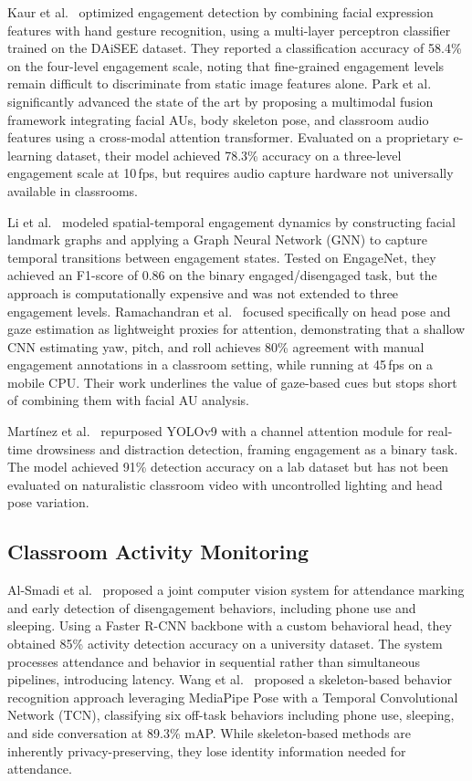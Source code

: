 \documentclass[preprint,12pt]{elsarticle}
\begin{document}
Kaur et al.~\cite{engagement_springer} optimized engagement detection by combining facial expression features with hand gesture recognition, using a multi-layer perceptron classifier trained on the DAiSEE dataset. They reported a classification accuracy of 58.4\% on the four-level engagement scale, noting that fine-grained engagement levels remain difficult to discriminate from static image features alone. Park et al.~\cite{lit_engagement_multimodal_2025} significantly advanced the state of the art by proposing a multimodal fusion framework integrating facial AUs, body skeleton pose, and classroom audio features using a cross-modal attention transformer. Evaluated on a proprietary e-learning dataset, their model achieved 78.3\% accuracy on a three-level engagement scale at 10\,fps, but requires audio capture hardware not universally available in classrooms.

Li et al.~\cite{lit_emotion_gnn_2025} modeled spatial-temporal engagement dynamics by constructing facial landmark graphs and applying a Graph Neural Network (GNN) to capture temporal transitions between engagement states. Tested on EngageNet, they achieved an F1-score of 0.86 on the binary engaged/disengaged task, but the approach is computationally expensive and was not extended to three engagement levels. Ramachandran et al.~\cite{lit_pose_attention_2025} focused specifically on head pose and gaze estimation as lightweight proxies for attention, demonstrating that a shallow CNN estimating yaw, pitch, and roll achieves 80\% agreement with manual engagement annotations in a classroom setting, while running at 45\,fps on a mobile CPU. Their work underlines the value of gaze-based cues but stops short of combining them with facial AU analysis.

Martínez et al.~\cite{lit_drowsiness_yolo_2025} repurposed YOLOv9 with a channel attention module for real-time drowsiness and distraction detection, framing engagement as a binary task. The model achieved 91\% detection accuracy on a lab dataset but has not been evaluated on naturalistic classroom video with uncontrolled lighting and head pose variation.

\subsection{Classroom Activity Monitoring}

Al-Smadi et al.~\cite{disengagement_ieee} proposed a joint computer vision system for attendance marking and early detection of disengagement behaviors, including phone use and sleeping. Using a Faster R-CNN backbone with a custom behavioral head, they obtained 85\% activity detection accuracy on a university dataset. The system processes attendance and behavior in sequential rather than simultaneous pipelines, introducing latency. Wang et al.~\cite{lit_activity_recognition_2025} proposed a skeleton-based behavior recognition approach leveraging MediaPipe Pose with a Temporal Convolutional Network (TCN), classifying six off-task behaviors including phone use, sleeping, and side conversation at 89.3\% mAP. While skeleton-based methods are inherently privacy-preserving, they lose identity information needed for attendance.
\end{document}
